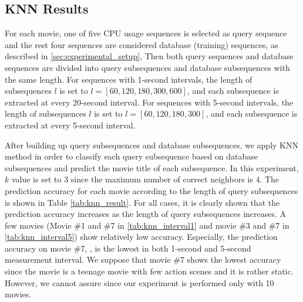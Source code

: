 \subsection{KNN Results}

For each movie, one of five CPU usage sequences is selected as query sequence and the rest four sequences are considered database (training) sequences, as described in \ref{sec:experimental_setup}, 
Then both query sequences and database sequences are divided into query subsequences and database subsequences with the same length.
For sequences with 1-second intervals, the length of subsequences $l$ is set to $l = [60, 120, 180, 300, 600]$, and each subsequence is extracted at every 20-second interval. 
For sequences with 5-second intervals, the length of subsequences $l$ is set to $l = [60, 120, 180, 300]$, and each subsequence is extracted at every 5-second interval. 

After building up query subsequences and database subsequences, we apply KNN method in order to classify each query subsequence based on database subsequences and predict the movie title of each subsequence. 
In this experiment, $k$ value is set to 3 since the maximum number of correct neighbors is 4. 
The prediction accuracy for each movie according to the length of query subsequences is shown in Table \ref{tab:knn_result}.
For all cases, it is clearly shown that the prediction accuracy increases as the length of query subsequences increases. 
A few movies (Movie \#1 and \#7 in \ref{tab:knn_interval1} and movie \#3 and \#7 in \ref{tab:knn_interval5}) show relatively low accuracy.
Especially, the prediction accuracy on movie \#7, , is the lowest in both 1-second and 5-second measurement interval.
We suppose that movie \#7 shows the lowest accuracy since the movie is a teenage movie with few action scenes and it is rather static.
However, we cannot assure since our experiment is performed only with 10 movies.


